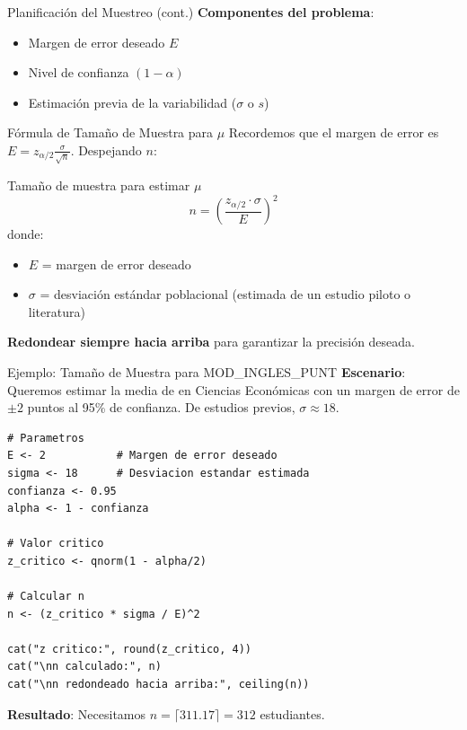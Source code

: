 \documentclass[aspectratio=169, 11pt]{beamer}
\begin{document}
\begin{frame}{Planificación del Muestreo (cont.)}
\textbf{Componentes del problema}:
\begin{itemize}
  \item Margen de error deseado $E$
  \item Nivel de confianza $(1-\alpha)$
  \item Estimación previa de la variabilidad ($\sigma$ o $s$)
\end{itemize}
\end{frame}

\begin{frame}{Fórmula de Tamaño de Muestra para $\mu$}
Recordemos que el margen de error es $E = z_{\alpha/2} \frac{\sigma}{\sqrt{n}}$. Despejando $n$:

\begin{block}{Tamaño de muestra para estimar $\mu$}
\[
n = \left( \frac{z_{\alpha/2} \cdot \sigma}{E} \right)^2
\]
donde:
\begin{itemize}
  \item $E$ = margen de error deseado
  \item $\sigma$ = desviación estándar poblacional (estimada de un estudio piloto o literatura)
\end{itemize}
\textbf{Redondear siempre hacia arriba} para garantizar la precisión deseada.
\end{block}
\end{frame}

\begin{frame}[fragile]{Ejemplo: Tamaño de Muestra para MOD\_INGLES\_PUNT}
\small
\textbf{Escenario}: Queremos estimar la media de  en Ciencias Econ\'omicas con un margen de error de $\pm 2$ puntos al 95\% de confianza. De estudios previos, $\sigma \approx 18$.

\begin{lstlisting}[basicstyle=\ttfamily\scriptsize]
# Parametros
E <- 2           # Margen de error deseado
sigma <- 18      # Desviacion estandar estimada
confianza <- 0.95
alpha <- 1 - confianza

# Valor critico
z_critico <- qnorm(1 - alpha/2)

# Calcular n
n <- (z_critico * sigma / E)^2

cat("z critico:", round(z_critico, 4))
cat("\nn calculado:", n)
cat("\nn redondeado hacia arriba:", ceiling(n))
\end{lstlisting}

\vspace{0.3cm}
\textbf{Resultado}: Necesitamos $n = \lceil 311.17 \rceil = 312$ estudiantes.
\end{frame}
\end{document}
